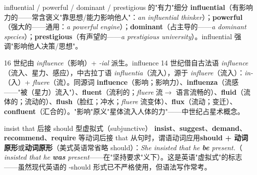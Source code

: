 \documentclass[../main.tex]{subfiles}
\begin{document}

\begin{lex}{influential / powerful / dominant / prestigious 的"有力"细分}
\textbf{influential}（有影响力的——常含褒义"靠思想/能力影响他人"：\textit{an influential thinker}）；\textbf{powerful}（强大的——通用：\textit{a powerful engine}）；\textbf{dominant}（占主导的——\textit{a dominant species}）；\textbf{prestigious}（有声望的——\textit{a prestigious university}）。influential 强调"影响他人决策/思想"。
\end{lex}

\begin{origin}
16 世纪由 \textit{influence}（影响）+ \textit{-ial} 派生。influence 14 世纪借自古法语 \textit{influence}（流入、星力、感应），中古拉丁语 \textit{influentia}（流入），源于 \textit{influere}（流入）：\textit{in-}（入）+ \textit{fluere}（流）。同源词 \textbf{influence}（影响；影响力）、\textbf{influenza}（流感——"被（星力）流入"）、\textbf{fluent}（流利的；\textit{fluere} 流$\to$ 语言流畅的）、\textbf{fluid}（流体的；流动的）、\textbf{flush}（脸红；冲水；\textit{fluere} 流变体）、\textbf{flux}（流动；变迁）、\textbf{confluent}（汇合的）。"影响"原义"星体流入人体的力"——中世纪占星术概念。
\end{origin}





\begin{gram}{insist that 后接 should 型虚拟式（subjunctive）}
\textbf{insist}、\textbf{suggest}、\textbf{demand}、\textbf{recommend}、\textbf{require} 等动词后接 that 从句时，谓语动词应用\textbf{should + 动词原形}或\textbf{动词原形}（美式英语常省略 should）：\textit{She insisted that he \textbf{be} present.}（ \textit{insisted that he \textbf{was} present}——在"坚持要求"义下）。这是英语"虚拟式"的标志——虽然现代英语的 -should 形式已不严格使用，但语法写作常考。
\end{gram}
\end{document}
